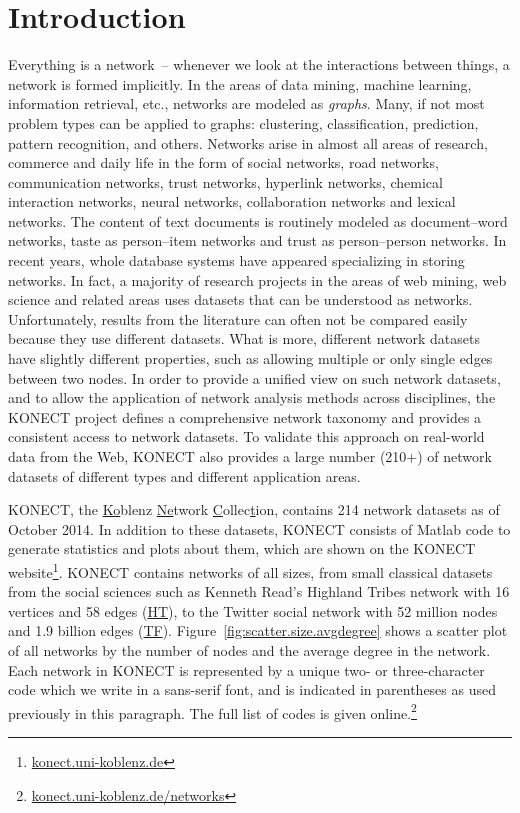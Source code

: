 \documentclass{article}
\begin{document}
\section{Introduction}
Everything is a network~-- whenever we look at the interactions between
things, a network is formed implicitly.  In the areas of data mining,
machine learning, information retrieval, etc., networks are modeled
as \emph{graphs}.  Many, if not most problem types can be applied to
graphs: clustering, classification, prediction, pattern recognition, and
others.  Networks arise in almost all areas of research, commerce and
daily life in the form of social networks, road networks, communication
networks, trust networks, hyperlink networks, chemical interaction
networks, neural networks, collaboration networks and lexical networks.
The content of text documents is routinely modeled as document--word
networks, taste as person--item networks and trust as person--person
networks.  In recent years, whole database systems have appeared
specializing in storing networks.  In fact, a majority of research
projects in the areas of web mining, web science and related areas uses
datasets that can be understood as networks.  Unfortunately, results
from the literature can often not be compared easily because
they use different datasets. What is more, different network datasets
have slightly different properties, such as allowing multiple or only
single edges between two nodes.  In order to provide a unified view on
such network datasets, and to allow the application of network analysis
methods across disciplines, the KONECT project defines a comprehensive
network taxonomy and provides a consistent access to network datasets.
To validate this approach on real-world data from the Web, KONECT
also provides a large number (210+) of network datasets of different
types and different application areas. 

KONECT, the \underline{Ko}blenz \underline{Ne}twork \underline
Collec\underline tion, contains 214 network datasets as of October 2014.
In addition to these datasets, KONECT consists of Matlab code to
generate statistics and plots about them, which are shown on the
KONECT
website\footnote{\href{http://konect.uni-koblenz.de/}{konect.uni-koblenz.de}}.
KONECT contains networks of all sizes, from small classical datasets
from the social sciences such as Kenneth Read's Highland Tribes network
with 16 vertices and 58 edges
(\href{http://konect.uni-koblenz.de/networks/ucidata-gama}{\textsf{HT}}),
to the Twitter social network with 52 million nodes and 1.9 billion
edges
(\href{http://konect.uni-koblenz.de/networks/twitter_mpi}{\textsf{TF}}).
Figure~\ref{fig:scatter.size.avgdegree} shows a scatter plot of all
networks by the number of nodes and the average degree in the network.
Each network in KONECT is represented by a unique two- or
three-character code which we write in a \textsf{sans-serif font}, and
is indicated in parentheses as used previously in this paragraph. The
full list of codes is given
online.\footnote{\href{http://konect.uni-koblenz.de/networks}{konect.uni-koblenz.de/networks}}
\end{document}
